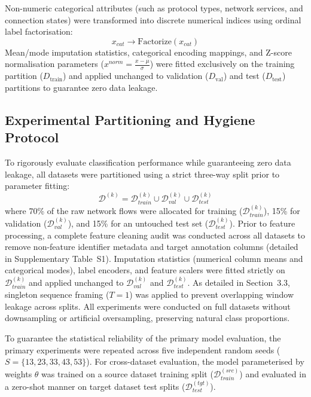 \documentclass[a4paper,fleqn]{cas-sc}
\begin{document}
Non-numeric categorical attributes (such as protocol types, network services, and connection states) were transformed into discrete numerical indices using ordinal label factorisation:
\begin{equation}
x_{cat} \rightarrow \text{Factorize}(x_{cat})
\end{equation}
Mean/mode imputation statistics, categorical encoding mappings, and Z-score normalisation parameters ($x^{norm} = \frac{x - \mu}{\sigma}$) were fitted exclusively on the training partition ($D_{\text{train}}$) and applied unchanged to validation ($D_{\text{val}}$) and test ($D_{\text{test}}$) partitions to guarantee zero data leakage.

\subsection{Experimental Partitioning and Hygiene Protocol}

To rigorously evaluate classification performance while guaranteeing zero data leakage, all datasets were partitioned using a strict three-way split prior to parameter fitting:
\begin{equation}
\mathcal{D}^{(k)} = \mathcal{D}^{(k)}_{train} \cup \mathcal{D}^{(k)}_{val} \cup \mathcal{D}^{(k)}_{test}
\end{equation}
where 70\% of the raw network flows were allocated for training ($\mathcal{D}^{(k)}_{train}$), 15\% for validation ($\mathcal{D}^{(k)}_{val}$), and 15\% for an untouched test set ($\mathcal{D}^{(k)}_{test}$). Prior to feature processing, a complete feature cleaning audit was conducted across all datasets to remove non-feature identifier metadata and target annotation columns (detailed in Supplementary Table~S1). Imputation statistics (numerical column means and categorical modes), label encoders, and feature scalers were fitted strictly on $\mathcal{D}^{(k)}_{train}$ and applied unchanged to $\mathcal{D}^{(k)}_{val}$ and $\mathcal{D}^{(k)}_{test}$. As detailed in Section~3.3, singleton sequence framing ($T = 1$) was applied to prevent overlapping window leakage across splits. All experiments were conducted on full datasets without downsampling or artificial oversampling, preserving natural class proportions.

To guarantee the statistical reliability of the primary model evaluation, the primary experiments were repeated across five independent random seeds ($S = \{13, 23, 33, 43, 53\}$). For cross-dataset evaluation, the model parameterised by weights $\theta$ was trained on a source dataset training split ($\mathcal{D}^{(src)}_{train}$) and evaluated in a zero-shot manner on target dataset test splits ($\mathcal{D}^{(tgt)}_{test}$).
\end{document}
